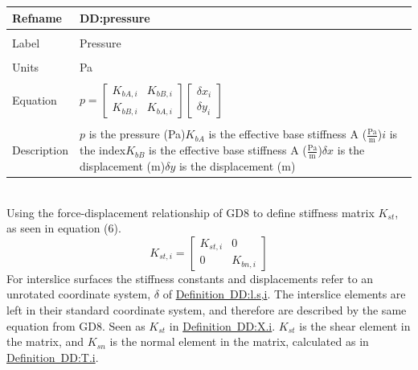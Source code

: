 \documentclass[12pt]{article}
\begin{document}
\noindent \begin{minipage}{\textwidth}
\begin{tabular}{p{} p{}}
\toprule \textbf{Refname} & \textbf{DD:pressure}
\label{DD:pressure}
\\ \midrule \\
Label & Pressure
\\ \midrule \\
Units & Pa
\\ \midrule \\
Equation & $p=\begin{bmatrix}
{K_{bA,i}} & {K_{bB,i}}\\
{K_{bB,i}} & {K_{bA,i}}
\end{bmatrix} \begin{bmatrix}
{δx}_{i}\\
{δy}_{i}
\end{bmatrix}$
\\ \midrule \\
Description & $p$ is the pressure (Pa)\newline${K_{bA}}$ is the effective base stiffness A ($\frac{\text{Pa}}{\text{m}}$)\newline$i$ is the index\newline${K_{bB}}$ is the effective base stiffness A ($\frac{\text{Pa}}{\text{m}}$)\newline$δx$ is the displacement (m)\newline$δy$ is the displacement (m)
\\ \bottomrule \end{tabular}
\end{minipage}\\
Using the force-displacement relationship of GD8 to define stiffness matrix ${K_{st}}$, as seen in equation (6).
\begin{dmath}
{K_{st,i}}=\begin{bmatrix}
{K_{st,i}} & 0\\
0 & {K_{bn,i}}
\end{bmatrix}
\end{dmath}
For interslice surfaces the stiffness constants and displacements refer to an unrotated coordinate system, $δ$ of \hyperref[DD:l.s,i]{Definition~DD:l.s,i}. The interslice elements are left in their standard coordinate system, and therefore are described by the same equation from GD8. Seen as ${K_{st}}$ in \hyperref[DD:X.i]{Definition~DD:X.i}. ${K_{st}}$ is the shear element in the matrix, and ${K_{sn}}$ is the normal element in the matrix, calculated as in \hyperref[DD:T.i]{Definition~DD:T.i}.
\end{document}
